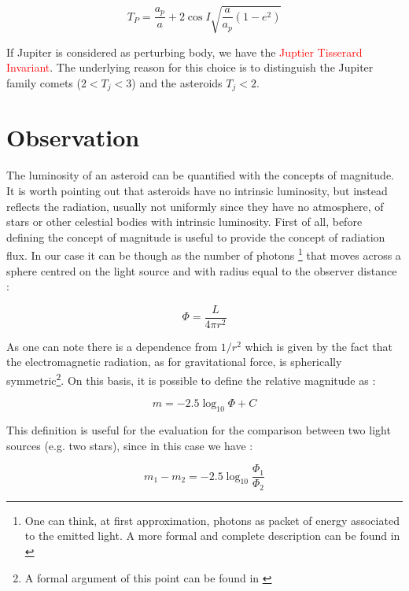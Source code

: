 \documentclass[12pt,%
               a4paper,%
               oneside,openany,%
               titlepage,%
               headinclude,footinclude,%
               BCOR5mm,%
               cleardoublepage=empty,%
               tablecaptionabove,%
               floatperchapter,
               ]{scrreprt}                 %
\begin{document}
\begin{equation}
T_{P}=\frac{a_{p}}{a}+2\cos I\sqrt{\dfrac{a}{a_{p}}(1-e^{2})}
\end{equation}

If Jupiter is considered as perturbing body, we have the \textcolor{red}{Juptier Tisserard Invariant}. The underlying reason for this choice is to distinguish the Jupiter family comets ($2<T_{j}<3$) and the asteroids $T_{j}<2$. 


\section{Observation}

The luminosity of an asteroid can be quantified with the concepts of magnitude. It is worth pointing out that asteroids have no intrinsic luminosity, but instead reflects the radiation, usually not uniformly since they have no atmosphere, of stars or other celestial bodies with intrinsic luminosity. 
First of all, before defining the concept of magnitude is useful to provide the concept of radiation flux. In our case it can be though as the number of photons \footnote{One can think, at first approximation, photons as packet of energy associated to the emitted light. A more formal and complete description can be found in \cite{feynman2018feynman} } that moves across a sphere centred on the light source and with radius equal to the observer distance \cite{burbine2016asteroids}:

\begin{equation}
\Phi=\frac{L}{4\pi r^{2}}
\end{equation}

As one can note there is a dependence from $1/r^{2}$ which is given by the fact that the electromagnetic radiation, as for gravitational force, is spherically symmetric\footnote{A formal argument of this point can be found in \cite{zee2013einstein}}. On this basis, it is possible to define the relative magnitude as \cite{burbine2016asteroids}:

\begin{equation}
m=-2.5\log_{10}\Phi+C
\end{equation}

This definition is useful for the evaluation for the comparison between two light sources (e.g. two stars), since in this case we have \cite{burbine2016asteroids}:

\begin{equation}
m_{1}-m_{2}=-2.5\log_{10}\frac{\Phi_{1}}{\Phi_{2}}
\end{equation}
\end{document}
